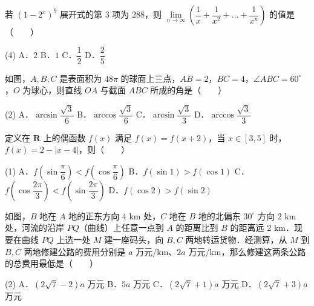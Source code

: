 \begin{question}
若 $(1 - 2^x)^9$ 展开式的第 $3$ 项为 $288$，则 $\lim\limits_{n \to \infty} \left(\dfrac{1}{x} + \dfrac{1}{x^2} + \dots + \dfrac{1}{x^n}\right)$ 的值是\mbox{（　　）}

\begin{gkopts}(4)
\task A．$2$
\task B．$1$
\task C．$\dfrac{1}{2}$
\task D．$\dfrac{2}{5}$
\end{gkopts}

\Needspace{0.4\textheight}
\end{question}
\begin{question}
如图，$A, B, C$ 是表面积为 $48\pi$ 的球面上三点，$AB = 2$，$BC = 4$，$\angle ABC = 60^\circ$，$O$ 为球心，则直线 $OA$ 与截面 $ABC$ 所成的角是\mbox{（　　）}

\begin{gkopts}(2)
\task A．$\arcsin\dfrac{\sqrt{3}}{6}$
\task B．$\arccos\dfrac{\sqrt{3}}{6}$
\task C．$\arcsin\dfrac{\sqrt{3}}{3}$
\task D．$\arccos\dfrac{\sqrt{3}}{3}$
\end{gkopts}
\nopagebreak[4]
\begin{center}\end{center}
\nopagebreak[4]
\end{question}
\begin{question}
定义在 $\mathbf{R}$ 上的偶函数 $f(x)$ 满足 $f(x) = f(x + 2)$，当 $x \in [3, 5]$ 时，$f(x) = 2 - |x - 4|$，则\mbox{（　　）}

\begin{gkopts}(1)
\task A．$f\left(\sin\dfrac{\pi}{6}\right) < f\left(\cos\dfrac{\pi}{6}\right)$
\task B．$f(\sin 1) > f(\cos 1)$
\task C．$f\left(\cos\dfrac{2\pi}{3}\right) < f\left(\sin\dfrac{2\pi}{3}\right)$
\task D．$f(\cos 2) > f(\sin 2)$
\end{gkopts}

\Needspace{0.4\textheight}
\end{question}
\begin{question}
如图，$B$ 地在 $A$ 地的正东方向 $4\text{ km}$ 处，$C$ 地在 $B$ 地的北偏东 $30^\circ$ 方向 $2\text{ km}$ 处，河流的沿岸 $PQ$（曲线）上任意一点到 $A$ 的距离比到 $B$ 的距离远 $2\text{ km}$．现要在曲线 $PQ$ 上选一处 $M$ 建一座码头，向 $B, C$ 两地转运货物．经测算，从 $M$ 到 $B, C$ 两地修建公路的费用分别是 $a$ 万元/$\text{km}$、$2a$ 万元/$\text{km}$，那么修建这两条公路的总费用最低是\mbox{（　　）}

\begin{gkopts}(2)
\task A．$(2\sqrt{7} - 2)a$ 万元
\task B．$5a$ 万元
\task C．$(2\sqrt{7} + 1)a$ 万元
\task D．$(2\sqrt{7} + 3)a$ 万元
\end{gkopts}
\nopagebreak[4]
\begin{center}\end{center}
\nopagebreak[4]
\end{question}

